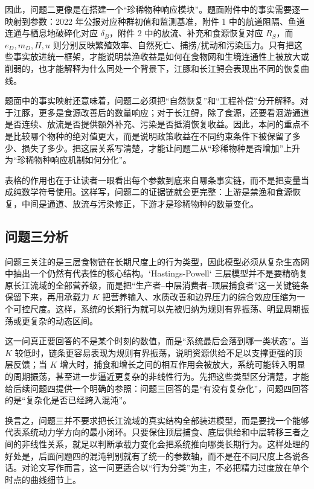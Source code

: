 \documentclass{MMCStyle}
\begin{document}
因此，问题二更像是在搭建一个“珍稀物种响应模块”。题面附件中的事实需要逐一映射到参数：2022 年公报对应种群初值和监测基准，附件 1 中的航道阻隔、鱼道连通与栖息地破碎化对应 \(\delta_B\)，附件 2 中的放流、补充和食源恢复对应 \(R_S\)，而 \(e_D,m_D,H,u\) 则分别反映繁殖效率、自然死亡、捕捞/扰动和污染压力。只有把这些事实放进统一框架，才能说明禁渔收益是如何在食物网和生境连通性上被放大或削弱的，也才能解释为什么同处一个背景下，江豚和长江鲟会表现出不同的恢复曲线\cite{report2022}。

题面中的事实映射还意味着，问题二必须把“自然恢复”和“工程补偿”分开解释。对于江豚，更多是食源改善后的数量响应；对于长江鲟，除了食源，还要看洄游通道是否连续、放流是否提供额外补充、污染是否抵消恢复收益。因此，本问的重点不是比较哪个物种的绝对值更大，而是说明政策收益在不同约束条件下被保留了多少、损失了多少。把这层关系写清楚，才能让问题二从“珍稀物种是否增加”上升为“珍稀物种响应机制如何分化”。

表格的作用也在于让读者一眼看出每个参数到底来自哪条事实链，而不是把变量当成纯数学符号使用。这样写，问题二的证据链就会更完整：上游是禁渔和食源恢复，中间是通道、放流与污染修正，下游才是珍稀物种的数量变化。

\subsection{问题三分析}
问题三关注的是三层食物链在长期尺度上的行为类型，因此模型必须从复杂生态网中抽出一个仍然有代表性的核心结构。`Hastings-Powell` 三层模型并不是要精确复原长江流域的全部营养级，而是把“生产者--中层消费者--顶层捕食者”这一关键链条保留下来，再用承载力 \(K\) 把营养输入、水质改善和边界压力的综合效应压缩为一个可控尺度。这样，系统的长期行为就可以先被归纳为规则有界振荡、明显周期振荡或更复杂的动态区间。

这一问真正要回答的不是某个时刻的数值，而是“系统最后会落到哪一类状态”。当 \(K\) 较低时，链条更容易表现为规则有界振荡，说明资源供给不足以支撑更强的顶层反馈；当 \(K\) 增大时，捕食和增长之间的相互作用会被放大，系统可能转入明显的周期振荡，甚至进一步逼近更复杂的非线性行为。先把这些类型区分清楚，才能给后续问题四提供一个明确的参照：问题三回答的是“有没有复杂化”，问题四回答的是“复杂化是否已经跨入混沌”。

换言之，问题三并不要求把长江流域的真实结构全部装进模型，而是要找一个能够代表系统动力学方向的最小闭环。只要保住顶层捕食、底层供给和中层转移三者之间的非线性关系，就足以判断承载力变化会把系统推向哪类长期行为。这样处理的好处是，后面问题四的混沌判别就有了统一的参数轴，而不是在不同尺度上各说各话。对论文写作而言，这一问更适合以“行为分类”为主，不必把精力过度放在单个时点的曲线细节上。
\end{document}
